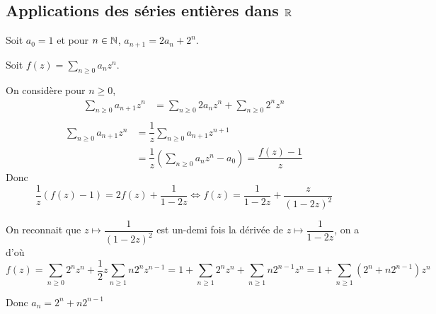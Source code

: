 \documentclass[a4paper,12pt]{article}
\begin{document}
\subsection{Applications des séries entières dans $\mathbb{R}$}

\begin{exemple}
    Soit $a_0 = 1$ et pour $n \in \mathbb{N}$, $a_{n+1} = 2 a_n + 2^n$.

    Soit $f(z) = \sum_{n \geq 0} a_n z^n$.

    On considère pour $n \geq 0$,
    \begin{align*}
        \sum\limits_{n \geq 0} a_{n+1}z^n &= \sum\limits_{n \geq 0} 2 a_n z^n + \sum\limits_{n \geq 0} 2^n z^n \\
    \end{align*}
    \begin{align*}
        \sum\limits_{n \geq 0} a_{n+1}z^n &= \dfrac{1}{z} \sum\limits_{n \geq 0} a_{n + 1} z^{n + 1} \\
        &= \dfrac{1}{z} \left( \sum\limits_{n \geq 0} a_n z^n - a_0 \right) = \dfrac{f(z) - 1}{z}
    \end{align*}
    Donc
    $$
    \dfrac{1}{z} (f(z) - 1) = 2 f(z) + \dfrac{1}{1 - 2z} \iff f(z) = \dfrac{1}{1 - 2z} + \dfrac{z}{(1 - 2z)^2}
    $$

    On reconnait que $z \mapsto \dfrac{1}{(1 - 2z)^2}$ est un-demi fois la dérivée de $z \mapsto \dfrac{1}{1 - 2z}$, on a
    d'où
    $$
    f(z) = \sum_{n \geq 0} 2^n z^n + \dfrac{1}{2}z \sum_{n \geq 1} n2^n z^{n - 1} = 1 + \sum_{n \geq 1} 2^n z^n + \sum_{n \geq 1} n 2^{n - 1} z^n = 1 + \sum_{n \geq 1} (2^n + n 2^{n - 1}) z^n
    $$ 

    Donc $a_n = 2^n + n2^{n - 1}$
\end{exemple}
\end{document}

